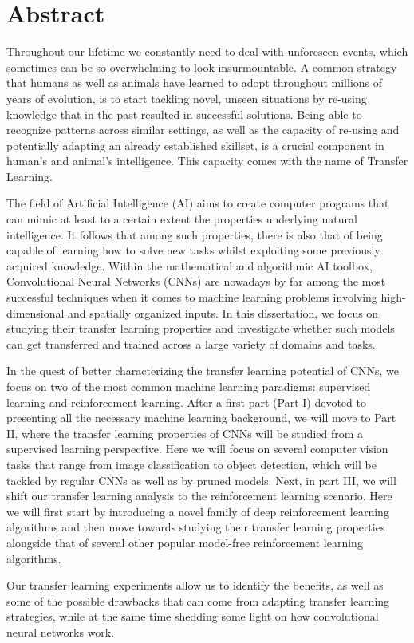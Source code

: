 


\begingroup
\let\clearpage\relax
\let\cleardoublepage\relax
\let\cleardoublepage\relax

\chapter*{Abstract}
Throughout our lifetime we constantly need to deal with unforeseen events, which sometimes can be so overwhelming to look insurmountable. A common strategy that humans as well as animals have learned to adopt throughout millions of years of evolution, is to start tackling novel, unseen situations by re-using knowledge that in the past resulted in successful solutions. Being able to recognize patterns across similar settings, as well as the capacity of re-using and potentially adapting an already established skillset, is a crucial component in human's and animal's intelligence. This capacity comes with the name of Transfer Learning. 	 

The field of Artificial Intelligence (AI) aims to create computer programs that can mimic at least to a certain extent the properties underlying natural intelligence. It follows that among such properties, there is also that of being capable of learning how to solve new tasks whilst exploiting some previously acquired knowledge. Within the mathematical and algorithmic AI toolbox, Convolutional Neural Networks (CNNs) are nowadays by far among the most successful techniques when it comes to machine learning problems involving high-dimensional and spatially organized inputs. In this dissertation, we focus on studying their transfer learning properties and investigate whether such models can get transferred and trained across a large variety of domains and tasks.	 
    
In the quest of better characterizing the transfer learning potential of CNNs, we focus on two of the most common machine learning paradigms: supervised learning and reinforcement learning. After a first part (Part I) devoted to presenting all the necessary machine learning background, we will move to Part II, where the transfer learning properties of CNNs will be studied from a supervised learning perspective. Here we will focus on several computer vision tasks that range from image classification to object detection, which will be tackled by regular CNNs as well as by pruned models. Next, in part III, we will shift our transfer learning analysis to the reinforcement learning scenario. Here we will first start by introducing a novel family of deep reinforcement learning algorithms and then move towards studying their transfer learning properties alongside that of several other popular model-free reinforcement learning algorithms. 	 
  
Our transfer learning experiments allow us to identify the benefits, as well as some of the possible drawbacks that can come from adapting transfer learning strategies, while at the same time shedding some light on how convolutional neural networks work. 	 
  
\endgroup			

\vfill

